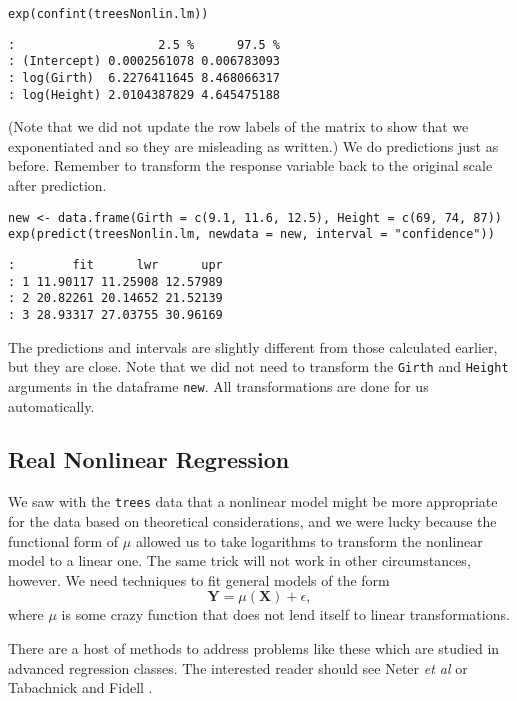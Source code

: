 \begin{verbatim}
exp(confint(treesNonlin.lm))
\end{verbatim}

\begin{verbatim}
:                    2.5 %      97.5 %
: (Intercept) 0.0002561078 0.006783093
: log(Girth)  6.2276411645 8.468066317
: log(Height) 2.0104387829 4.645475188
\end{verbatim}

(Note that we did not update the row labels of the matrix to show that
we exponentiated and so they are misleading as written.) We do
predictions just as before. Remember to transform the response
variable back to the original scale after prediction.

\begin{verbatim}
new <- data.frame(Girth = c(9.1, 11.6, 12.5), Height = c(69, 74, 87))
exp(predict(treesNonlin.lm, newdata = new, interval = "confidence"))
\end{verbatim}

\begin{verbatim}
:        fit      lwr      upr
: 1 11.90117 11.25908 12.57989
: 2 20.82261 20.14652 21.52139
: 3 28.93317 27.03755 30.96169
\end{verbatim}

The predictions and intervals are slightly different from those
calculated earlier, but they are close. Note that we did not need to
transform the \texttt{Girth} and \texttt{Height} arguments in the dataframe
\texttt{new}. All transformations are done for us automatically.

\subsection{Real Nonlinear Regression}
\label{sec-12-7-2}

We saw with the \texttt{trees} data that a nonlinear model might be more
appropriate for the data based on theoretical considerations, and we
were lucky because the functional form of \(\mu\) allowed us to take
logarithms to transform the nonlinear model to a linear one. The same
trick will not work in other circumstances, however. We need
techniques to fit general models of the form
\begin{equation}
\mathbf{Y}=\mu(\mathbf{X})+\epsilon,
\end{equation}
where \(\mu\) is some crazy function that does not lend itself to
linear transformations.

There are a host of methods to address problems like these which are
studied in advanced regression classes. The interested reader should
see Neter \emph{et al} \cite{Neter1996} or Tabachnick and Fidell
\cite{Tabachnick2006}.

